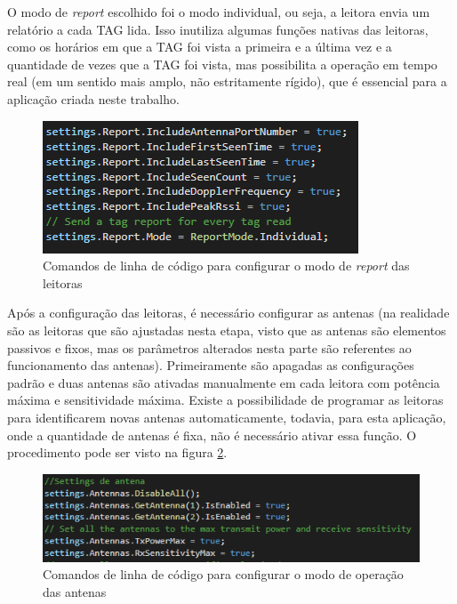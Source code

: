   O modo de \textit{report} escolhido foi o modo individual, ou seja, a leitora envia um relatório a cada TAG lida. Isso inutiliza algumas funções nativas das leitoras, como os horários em que a TAG foi vista a primeira e a última vez e a quantidade de vezes que a TAG foi vista, mas possibilita a operação em tempo real (em um sentido mais amplo, não estritamente rígido), que é essencial para a aplicação criada neste trabalho.

 \begin{figure}[H]
    \centering
    \includegraphics[width=0.6\linewidth]{figs/Metodologia/report_settings.PNG}
    \caption{Comandos de linha de código para configurar o modo de \textit{report} das leitoras}
    \label{fig:report_settings}
\end{figure}

 Após a configuração das leitoras, é necessário configurar as antenas (na realidade são as leitoras que são ajustadas nesta etapa, visto que as antenas são elementos passivos e fixos, mas os parâmetros alterados nesta parte são referentes ao funcionamento das antenas). Primeiramente são apagadas as configurações padrão e duas antenas são ativadas manualmente em cada leitora com potência máxima e sensitividade máxima. Existe a possibilidade de programar as leitoras para identificarem novas antenas automaticamente, todavia, para esta aplicação, onde a quantidade de antenas é fixa, não é necessário ativar essa função. O procedimento pode ser visto na figura \ref{fig:antenna_settings}.

 \begin{figure}[H]
    \centering
    \includegraphics[width=0.8\linewidth]{figs/Metodologia/antenna_settings.PNG}
    \caption{Comandos de linha de código para configurar o modo de operação das antenas}
    \label{fig:antenna_settings}
\end{figure}

